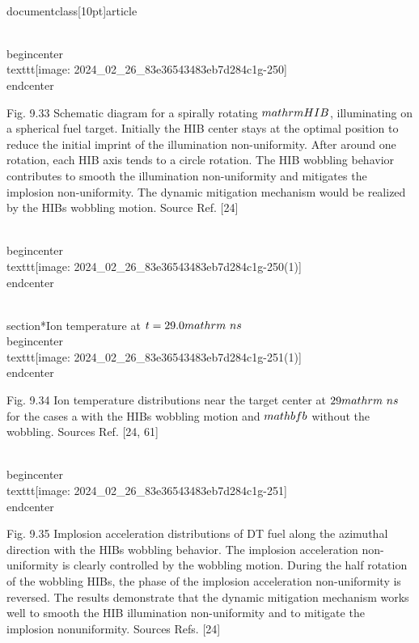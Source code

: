 \\documentclass[10pt]{article}
\begin{document}
{{{{{{\\begin{center}
\\texttt{[image: 2024\_02\_26\_83e36543483eb7d284c1g-250]}
\\end{center}

Fig. 9.33 Schematic diagram for a spirally rotating $\\mathrm{HIB}$, illuminating on a spherical fuel target. Initially the HIB center stays at the optimal position to reduce the initial imprint of the illumination non-uniformity. After around one rotation, each HIB axis tends to a circle rotation. The HIB wobbling behavior contributes to smooth the illumination non-uniformity and mitigates the implosion non-uniformity. The dynamic mitigation mechanism would be realized by the HIBs wobbling motion. Source Ref. [24]

\\begin{center}
\\texttt{[image: 2024\_02\_26\_83e36543483eb7d284c1g-250(1)]}
\\end{center}

\\section*{Ion temperature at $t=29.0 \\mathrm{~ns}$}
\\begin{center}
\\texttt{[image: 2024\_02\_26\_83e36543483eb7d284c1g-251(1)]}
\\end{center}

Fig. 9.34 Ion temperature distributions near the target center at $29 \\mathrm{~ns}$ for the cases a with the HIBs wobbling motion and $\\mathbf{b}$ without the wobbling. Sources Ref. [24, 61]

\\begin{center}
\\texttt{[image: 2024\_02\_26\_83e36543483eb7d284c1g-251]}
\\end{center}

Fig. 9.35 Implosion acceleration distributions of DT fuel along the azimuthal direction with the HIBs wobbling behavior. The implosion acceleration non-uniformity is clearly controlled by the wobbling motion. During the half rotation of the wobbling HIBs, the phase of the implosion acceleration non-uniformity is reversed. The results demonstrate that the dynamic mitigation mechanism works well to smooth the HIB illumination non-uniformity and to mitigate the implosion nonuniformity. Sources Refs. [24]

}}}}}}
\end{document}
